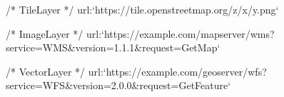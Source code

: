 /* TileLayer */
url:`https://tile.openstreetmap.org/{z}/{x}/{y}.png`

/* ImageLayer */
url:`https://example.com/mapserver/wms?service=WMS&version=1.1.1&request=GetMap`

/* VectorLayer */
url:`https://example.com/geoserver/wfs?service=WFS&version=2.0.0&request=GetFeature`
